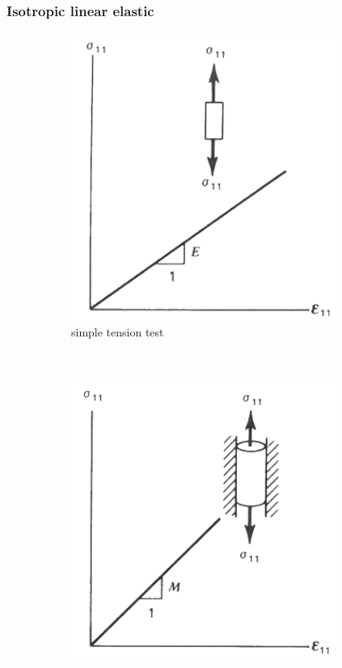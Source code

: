 \documentclass[notes]{beamer}
\begin{document}
\begin{frame}
  \frametitle{Isotropic linear elastic}
	  \begin{figure}[t!]
	    \centering
	    \begin{subfigure}[t]{0.5\textwidth}
	        \centering
	        \includegraphics[width=0.95\textwidth]{figs/isotropic-linear-elastic-1.png}
	        \caption{simple tension test}
	    \end{subfigure}%
	    ~ 
	    \begin{subfigure}[t]{0.5\textwidth}
	        \centering
 	        \includegraphics[width=0.95\textwidth]{figs/isotropic-linear-elastic-3.png}

\end{subfigure}
\end{figure}
\end{frame}
\end{document}
